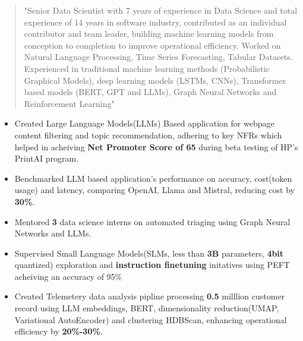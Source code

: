 \documentclass[10pt,a4paper,ragged2e,withhyper]{altacv}
\author{Gaurav Sood}
\date{\today}
\title{}
\begin{document}

\makecvheader

\begin{paracol}{1}
 \begin{quote}
"Senior Data Scientist with 7 years of experience in Data Science and total experience of 14 years in software industry, contributed as an individual contributor and team leader, building machine learning models from conception to completion to improve operational efficiency. Worked on  Natural Language Processing, Time Series Forecasting, Tabular Datasets. Experienced in traditional machine learning methods (Probabilistic Graphical Models), deep learning models (LSTMs, CNNs), Transformer based models (BERT, GPT and LLMs), Graph Neural Networks and Reinforcement Learning"
 \end{quote}
\label{sec:org29bdfba}


\divider

\divider


\label{sec:org7044fcf}

\begin{itemize}
\item Created Large Language Models(LLMs) Based application for webpage content
filtering and topic recommendation, adhering to key NFRs which helped in
acheiving \textbf{\textbf{Net Promoter Score of 65}} during beta testing of HP's PrintAI
program.
\item Benchmarked LLM based application's performance on accuracy, cost(token usage)
and latency, comparing OpenAI, Llama and Mistral, reducing cost by \textbf{\textbf{30\%}}.
\item Mentored \textbf{\textbf{3}} data science interns on automated triaging using Graph Neural
Networks and LLMs.
\item Supervised Small Language Models(SLMs, less than \textbf{\textbf{3B}} parameters, \textbf{\textbf{4bit}}
quantized) exploration and \textbf{\textbf{instruction finetuning}}
initatives using PEFT acheiving an accuracy of 95\%
\item Created Telemetery data analysis pipline processing \textbf{\textbf{0.5}} milllion customer
record using LLM embeddings, BERT, dimensionality reduction(UMAP, Variational
AutoEncoder) and clustering HDBScan, enhancing operational efficiency by \textbf{\textbf{20\%-30\%}}.
\end{itemize}


\end{paracol}
\end{document}
